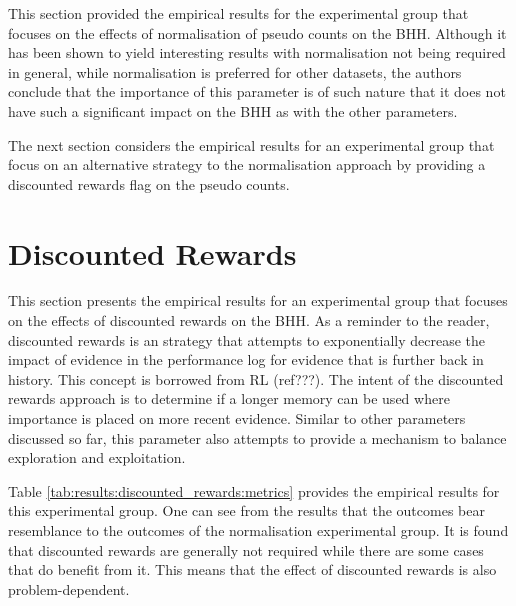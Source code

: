 This section provided the empirical results for the experimental group that focuses on the effects of normalisation of pseudo counts on the \Ac{BHH}. Although it has been shown to yield interesting results with normalisation not being required in general, while normalisation is preferred for other datasets, the authors conclude that the importance of this parameter is of such nature that it does not have such a significant impact on the \Ac{BHH} as with the other parameters.

The next section considers the empirical results for an experimental group that focus on an alternative strategy to the normalisation approach by providing a discounted rewards flag on the pseudo counts.
















\section{Discounted Rewards}
\label{sec:results:discounted_rewards}

This section presents the empirical results for an experimental group that focuses on the effects of discounted rewards on the \Ac{BHH}. As a reminder to the reader, discounted rewards is an strategy that attempts to exponentially decrease the impact of evidence in the performance log for evidence that is further back in history. This concept is borrowed from \Ac{RL} (ref???). The intent of the discounted rewards approach is to determine if a longer memory can be used where importance is placed on more recent evidence. Similar to other parameters discussed so far, this parameter also attempts to provide a mechanism to balance exploration and exploitation.

Table \ref{tab:results:discounted_rewards:metrics} provides the empirical results for this experimental group. One can see from the results that the outcomes bear resemblance to the outcomes of the normalisation experimental group. It is found that discounted rewards are generally not required while there are some cases that do benefit from it. This means that the effect of discounted rewards is also problem-dependent.

